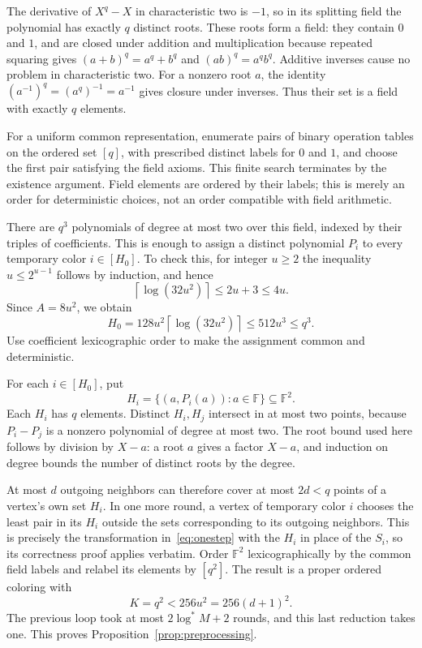 \documentclass[11pt,a4paper]{article}
\numberwithin{equation}{section}
\newcommand{\logstar}{\log^{*}}
\begin{document}
The derivative of \(X^q-X\) in characteristic two is \(-1\), so
in its splitting field the polynomial has exactly \(q\) distinct
roots. These roots form a field: they contain \(0\) and \(1\), and
are closed under addition and multiplication because repeated
squaring gives \((a+b)^q=a^q+b^q\) and
\((ab)^q=a^qb^q\). Additive inverses cause no problem in
characteristic two. For a nonzero root \(a\), the identity
\((a^{-1})^q=(a^q)^{-1}=a^{-1}\) gives closure under inverses.
Thus their set is a field with exactly \(q\) elements.

For a uniform common representation, enumerate pairs of binary
operation tables on the ordered set \([q]\), with prescribed
distinct labels for \(0\) and \(1\), and choose the first pair
satisfying the field axioms. This finite search terminates by the
existence argument. Field elements are ordered by their labels;
this is merely an order for deterministic choices, not an order
compatible with field arithmetic.

There are \(q^3\) polynomials of degree at most two over this field,
indexed by their triples of coefficients. This is enough to
assign a distinct polynomial \(P_i\) to every temporary color
\(i\in[H_0]\). To check this, for integer \(u\geq2\) the inequality
\(u\leq2^{u-1}\) follows by induction, and hence
\[
 \left\lceil\log(32u^2)\right\rceil
 \leq 2u+3\leq4u.
\]
Since \(A=8u^2\), we obtain
\begin{equation}
 H_0
 =128u^2\left\lceil\log(32u^2)\right\rceil
 \leq512u^3
 \leq q^3.
 \label{eq:polynomialcount}
\end{equation}
Use coefficient lexicographic order to make the assignment common
and deterministic.

For each \(i\in[H_0]\), put
\[
 H_i=\{(a,P_i(a)):a\in\mathbb F\}\subseteq\mathbb F^2.
\]
Each \(H_i\) has \(q\) elements. Distinct \(H_i,H_j\) intersect in
at most two points, because \(P_i-P_j\) is a nonzero polynomial of
degree at most two. The root bound used here follows by division
by \(X-a\): a root \(a\) gives a factor \(X-a\), and induction on
degree bounds the number of distinct roots by the degree.

At most \(d\) outgoing neighbors can therefore cover at most
\(2d<q\) points of a vertex's own set \(H_i\).
In one more round, a vertex of temporary color \(i\) chooses the
least pair in its \(H_i\) outside the sets corresponding to its
outgoing neighbors. This is precisely the transformation
in~\eqref{eq:onestep} with the \(H_i\) in place of the \(S_i\),
so its correctness proof applies verbatim.
Order \(\mathbb F^2\) lexicographically by the common field labels
and relabel its elements by \([q^2]\).
The result is a proper ordered coloring with
\[
 K=q^2<256u^2=256(d+1)^2.
\]
The previous loop took at most \(2\logstar M+2\) rounds, and this
last reduction takes one. This proves
Proposition~\ref{prop:preprocessing}.
\end{document}
